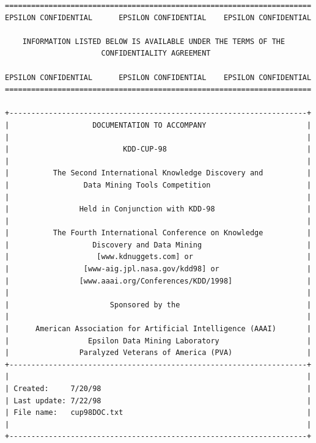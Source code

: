 \documentclass[
  11pt,
  a4paper,
  DIV=12,captions=tableheading,oneside,titlepage]{scrbook}
\begin{document}
\begin{verbatim}
======================================================================
EPSILON CONFIDENTIAL      EPSILON CONFIDENTIAL    EPSILON CONFIDENTIAL

    INFORMATION LISTED BELOW IS AVAILABLE UNDER THE TERMS OF THE  
                      CONFIDENTIALITY AGREEMENT                

EPSILON CONFIDENTIAL      EPSILON CONFIDENTIAL    EPSILON CONFIDENTIAL
======================================================================

+--------------------------------------------------------------------+
|                   DOCUMENTATION TO ACCOMPANY                       |
|                                                                    |
|                          KDD-CUP-98                                |
|                                                                    |
|          The Second International Knowledge Discovery and          |
|                 Data Mining Tools Competition                      |
|                                                                    |
|                Held in Conjunction with KDD-98                     |
|                                                                    |
|          The Fourth International Conference on Knowledge          |
|                   Discovery and Data Mining                        |
|                    [www.kdnuggets.com] or                          |
|                 [www-aig.jpl.nasa.gov/kdd98] or                    |
|                [www.aaai.org/Conferences/KDD/1998]                 |
|                                                                    |
|                       Sponsored by the                             |
|                                                                    |
|      American Association for Artificial Intelligence (AAAI)       |
|                  Epsilon Data Mining Laboratory                    |
|                Paralyzed Veterans of America (PVA)                 |
+--------------------------------------------------------------------+
|                                                                    |
| Created:     7/20/98                                               |
| Last update: 7/22/98                                               |
| File name:   cup98DOC.txt                                          |
|                                                                    |
+--------------------------------------------------------------------+


\end{verbatim}
\end{document}
